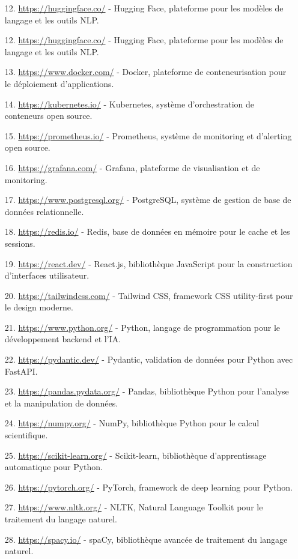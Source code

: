 \begin{itemize}[leftmargin=1cm, itemsep=0.3em, parsep=0.2em]
    \item[12.] \url{https://huggingface.co/} - Hugging Face, plateforme pour les modèles de langage et les outils NLP.
    \item[12.] \url{https://huggingface.co/} - Hugging Face, plateforme pour les modèles de langage et les outils NLP.
    \item[13.] \url{https://www.docker.com/} - Docker, plateforme de conteneurisation pour le déploiement d'applications.
    \item[14.] \url{https://kubernetes.io/} - Kubernetes, système d'orchestration de conteneurs open source.
    \item[15.] \url{https://prometheus.io/} - Prometheus, système de monitoring et d'alerting open source.
    \item[16.] \url{https://grafana.com/} - Grafana, plateforme de visualisation et de monitoring.
    \item[17.] \url{https://www.postgresql.org/} - PostgreSQL, système de gestion de base de données relationnelle.
    \item[18.] \url{https://redis.io/} - Redis, base de données en mémoire pour le cache et les sessions.
    \item[19.] \url{https://react.dev/} - React.js, bibliothèque JavaScript pour la construction d'interfaces utilisateur.
    \item[20.] \url{https://tailwindcss.com/} - Tailwind CSS, framework CSS utility-first pour le design moderne.
    \item[21.] \url{https://www.python.org/} - Python, langage de programmation pour le développement backend et l'IA.
    \item[22.] \url{https://pydantic.dev/} - Pydantic, validation de données pour Python avec FastAPI.
    \item[23.] \url{https://pandas.pydata.org/} - Pandas, bibliothèque Python pour l'analyse et la manipulation de données.
    \item[24.] \url{https://numpy.org/} - NumPy, bibliothèque Python pour le calcul scientifique.
    \item[25.] \url{https://scikit-learn.org/} - Scikit-learn, bibliothèque d'apprentissage automatique pour Python.
    \item[26.] \url{https://pytorch.org/} - PyTorch, framework de deep learning pour Python.
    \item[27.] \url{https://www.nltk.org/} - NLTK, Natural Language Toolkit pour le traitement du langage naturel.
    \item[28.] \url{https://spacy.io/} - spaCy, bibliothèque avancée de traitement du langage naturel.

\end{itemize}
